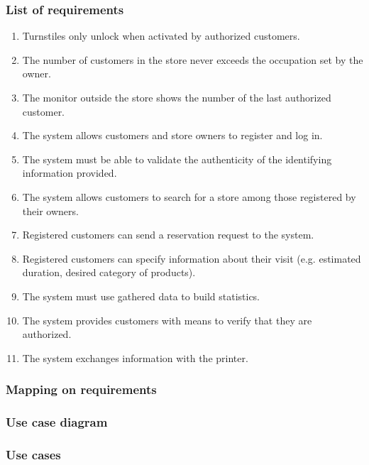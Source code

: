 \subsubsection{List of requirements}
\begin{enumerate}[label=R\arabic*]
	\item Turnstiles only unlock when activated by authorized customers.
	\item The number of customers in the store never exceeds the occupation set by the owner.
	\item The monitor outside the store shows the number of the last authorized customer.
	\item The system allows customers and store owners to register and log in.
	\item The system must be able to validate the authenticity of the identifying information provided.
	\item The system allows customers to search for a store among those registered by their owners.
	\item Registered customers can send a reservation request to the system.
	\item Registered customers can specify information about their visit (e.g. estimated duration, desired category of products).
	\item The system must use gathered data to build statistics. %
	\item The system provides customers with means to verify that they are authorized.
	\item The system exchanges information with the printer.
\end{enumerate}
\subsubsection{Mapping on requirements}
\subsubsection{Use case diagram}
\subsubsection{Use cases}
